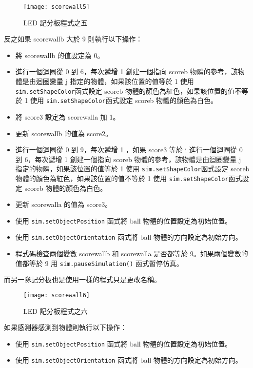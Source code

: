 \begin{figure}[hbt!]
\begin{center}
\texttt{[image: scorewall5]}
\caption{\Large LED 記分板程式之五}\label{LED 記分板程式之五}
\end{center}
\end{figure} 
反之如果 scorewallb 大於 9 則執行以下操作：\\
\begin{itemize}
\item 將 scorewallb 的值設定為 0。\\
\item 進行一個迴圈從 0 到 6，每次遞增 1 創建一個指向 scoreb 物體的參考，該物體是由迴圈變量 j 指定的物體，如果該位置的值等於 1 使用 \texttt{sim.setShapeColor}函式設定 scoreb 物體的顏色為紅色，如果該位置的值不等於 1 使用 \texttt{sim.setShapeColor}函式設定 scoreb 物體的顏色為白色。\\
\item 將 score3 設定為 scorewalla 加 1。\\
\item 更新 scorewallb 的值為 score2。\\
\item 進行一個迴圈從 0 到 9，每次遞增 1 ，如果 score3 等於 i 進行一個迴圈從 0 到 6，每次遞增 1 創建一個指向 scoreb 物體的參考，該物體是由迴圈變量 j 指定的物體，如果該位置的值等於 1 使用 \texttt{sim.setShapeColor}函式設定 scoreb 物體的顏色為紅色，如果該位置的值不等於 1 使用 \texttt{sim.setShapeColor}函式設定 scoreb 物體的顏色為白色。\\
\item 更新 scorewalla 的值為 score3。\\
\item 使用 \texttt{sim.setObjectPosition} 函式將 ball 物體的位置設定為初始位置。\\
\item 使用 \texttt{sim.setObjectOrientation} 函式將 ball 物體的方向設定為初始方向。\\
\item 程式碼檢查兩個變數 scorewallb 和 scorewalla 是否都等於 9。如果兩個變數的值都等於 9 用  \texttt{sim.pauseSimulation()} 函式暫停仿真。\\
\end{itemize}
而另一隊記分板也是使用一樣的程式只是更改名稱。\\

\begin{figure}[hbt!]
\begin{center}
\texttt{[image: scorewall6]}
\caption{\Large LED 記分板程式之六}\label{LED 記分板程式之六}
\end{center}
\end{figure} 
如果感測器感測到物體則執行以下操作：\\
\begin{itemize}
\item 使用 \texttt{sim.setObjectPosition} 函式將 ball 物體的位置設定為初始位置。\\
\item 使用 \texttt{sim.setObjectOrientation} 函式將 ball 物體的方向設定為初始方向。\\
\end{itemize}

\renewcommand{\baselinestretch}{1.0} %